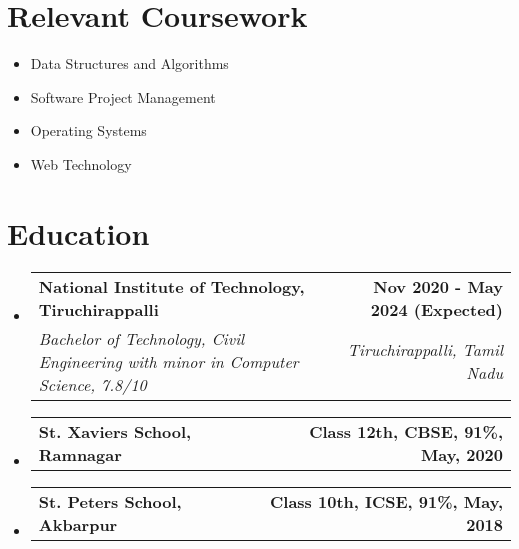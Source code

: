 \documentclass[letterpaper,11pt]{article}
\makeatletter
\newcommand{\resumeSubheading}[4]{
  \vspace{-2pt}\item
    \begin{tabular*}{1.0\textwidth}[t]{l@{\extracolsep{\fill}}r}
      \textbf{#1} & \textbf{\small #2} \\
      \textit{\small#3} & \textit{\small #4} \\
    \end{tabular*}\vspace{-8pt}
}
\newcommand{\eduSubheading}[2]{
  \vspace{-2pt}\item
    \begin{tabular*}{1.0\textwidth}[t]{l@{\extracolsep{\fill}}r}
      \textbf{#1} & \textbf{\small #2} \\
    \end{tabular*}\vspace{-8pt}
}
\newcommand{\resumeSubHeadingListStart}{\begin{itemize}[leftmargin=0.0in, label={}]}
\newcommand{\resumeSubHeadingListEnd}{\end{itemize}}
\makeatother
\begin{document}
\section{Relevant Coursework}
        \begin{multicols}{4}
            \begin{itemize}[itemsep=-5pt, parsep=10pt]
                \item Data Structures and Algorithms
                \item Software Project Management
                \item Operating Systems
                \item Web Technology
            \end{itemize}
        \end{multicols}
        \vspace*{2.0\multicolsep}

\section{Education}
  \resumeSubHeadingListStart
    \resumeSubheading
      {National Institute of Technology, Tiruchirappalli}{Nov 2020 - May 2024 (Expected)}
      {Bachelor of Technology, Civil Engineering with minor in Computer Science, 7.8/10}{Tiruchirappalli, Tamil Nadu}
  \resumeSubHeadingListEnd
  \resumeSubHeadingListStart
    \eduSubheading
      {St. Xavier\textquotesingle{}s School, Ramnagar}{Class 12th, CBSE, 91\%, May, 2020}
  \resumeSubHeadingListEnd
  \resumeSubHeadingListStart
    \eduSubheading
      {St. Peter\textquotesingle{}s School, Akbarpur}{Class 10th, ICSE, 91\%, May, 2018}
  \resumeSubHeadingListEnd
\end{document}
